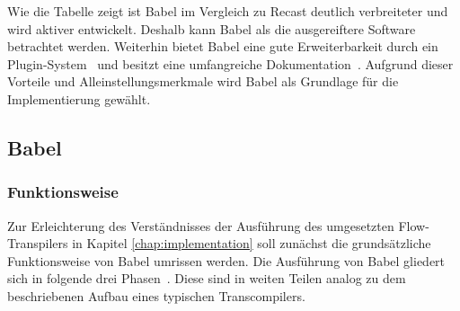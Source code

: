 Wie die Tabelle zeigt ist Babel im Vergleich zu Recast deutlich verbreiteter und wird aktiver entwickelt. Deshalb kann Babel als die ausgereiftere Software betrachtet werden. Weiterhin bietet Babel eine gute Erweiterbarkeit durch ein Plugin-System~\autocite{BABEL:HANDBOOK} und besitzt eine umfangreiche Dokumentation~\autocite{BABEL:DOCS}. Aufgrund dieser Vorteile und Alleinstellungsmerkmale wird Babel als Grundlage für die Implementierung gewählt.

\subsection{Babel}
\label{sec:babel}

\subsubsection{Funktionsweise}

Zur Erleichterung des Verständnisses der Ausführung des umgesetzten Flow-Transpilers in Kapitel \ref{chap:implementation} soll zunächst die grundsätzliche Funktionsweise von Babel umrissen werden. Die Ausführung von Babel gliedert sich in folgende drei Phasen~\autocite{BABEL:HANDBOOK}. Diese sind in weiten Teilen analog zu dem beschriebenen Aufbau eines typischen Transcompilers.

